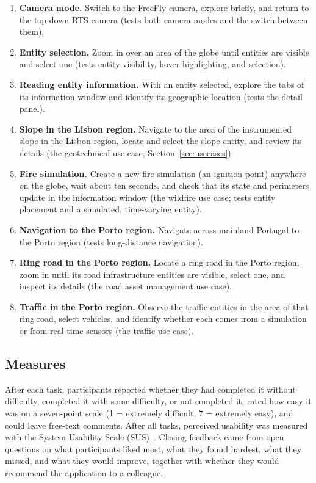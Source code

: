 \begin{enumerate}
    \item \textbf{Camera mode.} Switch to the FreeFly camera, explore briefly, and return to the top-down RTS camera (tests both camera modes and the switch between them).
    \item \textbf{Entity selection.} Zoom in over an area of the globe until entities are visible and select one (tests entity visibility, hover highlighting, and selection).
    \item \textbf{Reading entity information.} With an entity selected, explore the tabs of its information window and identify its geographic location (tests the detail panel).
    \item \textbf{Slope in the Lisbon region.} Navigate to the area of the instrumented slope in the Lisbon region, locate and select the slope entity, and review its details (the geotechnical use case, Section~\ref{sec:usecases}).
    \item \textbf{Fire simulation.} Create a new fire simulation (an ignition point) anywhere on the globe, wait about ten seconds, and check that its state and perimeters update in the information window (the wildfire use case; tests entity placement and a simulated, time-varying entity).
    \item \textbf{Navigation to the Porto region.} Navigate across mainland Portugal to the Porto region (tests long-distance navigation).
    \item \textbf{Ring road in the Porto region.} Locate a ring road in the Porto region, zoom in until its road infrastructure entities are visible, select one, and inspect its details (the road asset management use case).
    \item \textbf{Traffic in the Porto region.} Observe the traffic entities in the area of that ring road, select vehicles, and identify whether each comes from a simulation or from real-time sensors (the traffic use case).
\end{enumerate}

\subsection{Measures}

After each task, participants reported whether they had completed it without difficulty, completed it with some difficulty, or not completed it, rated how easy it was on a seven-point scale (1 = extremely difficult, 7 = extremely easy), and could leave free-text comments. After all tasks, perceived usability was measured with the System Usability Scale (SUS)~\cite{brooke1996sus}. Closing feedback came from open questions on what participants liked most, what they found hardest, what they missed, and what they would improve, together with whether they would recommend the application to a colleague.

